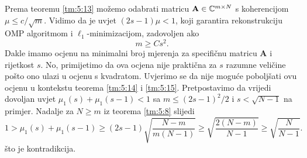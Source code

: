 \documentclass[a4paper,twoside,12pt]{memoir} %
\newcommand{\vect}[1]{\mathbf{#1}}
\renewcommand{\vec}{\vect}
\begin{document}
Prema teoremu \ref{tm:5:13} mo\v{z}emo odabrati matricu $\vec A \in \C^{m \times N}$ s koherencijom $\mu \leq c/\sqrt{m}$. Vidimo da je uvjet $(2s - 1)\mu < 1$, koji garantira rekonstrukciju OMP algoritmom i $\ell_1$-minimizacijom, zadovoljen ako
\begin{equation}\label{5:15}
    m \geq Cs^2.
\end{equation}
Dakle imamo ocjenu na minimalni broj mjerenja za specifi\v{c}nu matricu $\vec A$ i rijetkost $s$. No, primijetimo da ova ocjena nije prakti\v{c}na za $s$ razumne veli\v{c}ine po\v{s}to ono ulazi u ocjenu s kvadratom. Uvjerimo se da nije mogu\'ce pobolj\v{s}ati ovu ocjenu u kontekstu teorema \ref{tm:5:14} i \ref{tm:5:15}. Pretpostavimo da vrijedi dovoljan uvjet $\mu_1(s) + \mu_1(s-1) < 1$ sa $m  \leq (2s-1)^2/2$ i $s < \sqrt{N-1}$ na primjer. Nadalje za $N \geq m$ iz teorema \ref{tm:5:8} slijedi
\begin{equation*}
    1 > \mu_1(s) + \mu_1(s-1) \geq (2s-1) \sqrt{\frac{N-m}{m(N-1)}} \geq \sqrt{\frac{2(N-m)}{N-1}} \geq \sqrt{\frac{N}{N-1}}.
\end{equation*}
\v{s}to je kontradikcija.
\end{document}
